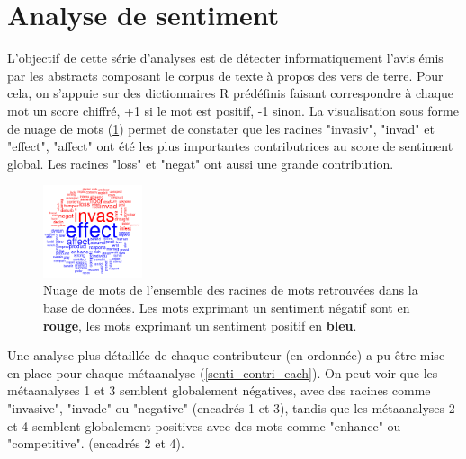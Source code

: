 \documentclass{book}
\begin{document}
\thispagestyle{fancy}

\section{Analyse de sentiment}
\noindent
L'objectif de cette série d'analyses est de détecter informatiquement l'avis émis par les abstracts composant le corpus de texte à propos des vers de terre. Pour cela, on s'appuie sur des dictionnaires R prédéfinis faisant correspondre à chaque mot un score chiffré, +1 si le mot est positif, -1 sinon. La visualisation sous forme de nuage de mots (\cref{senti_cloud_all}) permet de constater que les racines "invasiv", "invad" et "effect", "affect" ont été les plus importantes contributrices au score de sentiment global. Les racines "loss" et "negat" ont aussi une grande contribution.

\begin{figure}[htb] %
    \begin{center} %
        \includegraphics[width=0.26\textwidth]{senti_cloud_all.png}
        \caption[Nuage de mots de l'ensemble des racines de mots positives/négatives retrouvées dans la base de données, colorées par sentiment]{Nuage de mots de l'ensemble des racines de mots retrouvées dans la base de données. Les mots exprimant un sentiment négatif sont en \textbf{rouge}, les mots exprimant un sentiment positif en \textbf{bleu}.\label{senti_cloud_all}}
    \end{center}  
\end{figure}

Une analyse plus détaillée de chaque contributeur (en ordonnée) a pu être mise en place pour chaque métaanalyse (\cref{senti_contri_each}). On peut voir que les métaanalyses 1 et 3 semblent globalement négatives, avec des racines comme "invasive", "invade" ou "negative" (encadrés 1 et 3), tandis que les métaanalyses 2 et 4 semblent globalement positives avec des mots comme "enhance" ou "competitive".  (encadrés 2 et 4).
\end{document}

